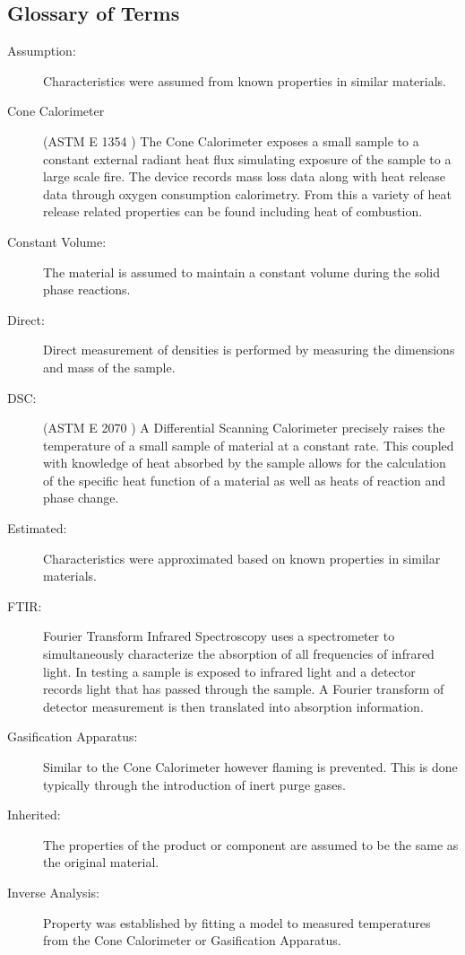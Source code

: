 \subsection{Glossary of Terms}
\label{glossary}

\begin{description}
\item[Assumption:]  Characteristics were assumed from known properties in similar materials.
\item[Cone Calorimeter] (ASTM E 1354 \cite{conecal}) The Cone Calorimeter exposes a small sample to a constant external radiant heat flux simulating exposure of the sample to a large scale fire. The device records mass loss data along with heat release data through oxygen consumption calorimetry. From this a variety of heat release related properties can be found including heat of combustion.
\item[Constant Volume:] The material is assumed to maintain a constant volume during the solid phase reactions.
\item[Direct:]  Direct measurement of densities is performed by measuring the dimensions and mass of the sample.
\item[DSC:] (ASTM E 2070 \cite{diffscancal}) A Differential Scanning Calorimeter precisely raises the temperature of a small sample of material at a constant rate. This coupled with knowledge of heat absorbed by the sample allows for the calculation of the specific heat function of a material as well as heats of reaction and phase change.
\item[Estimated:] Characteristics were approximated based on known properties in similar materials.
\item[FTIR:] Fourier Transform Infrared Spectroscopy uses a spectrometer to simultaneously characterize the absorption of all frequencies of infrared light. In testing a sample is exposed to infrared light and a detector records light that has passed through the sample. A Fourier transform of detector measurement is then translated into absorption information.
\item[Gasification Apparatus:] Similar to the Cone Calorimeter however flaming is prevented. This is done typically through the introduction of inert purge gases.
\item[Inherited:] The properties of the product or component are assumed to be the same as the original material.
\item[Inverse Analysis:] Property was established by fitting a model to measured temperatures from the Cone Calorimeter or Gasification Apparatus.

\end{description}
